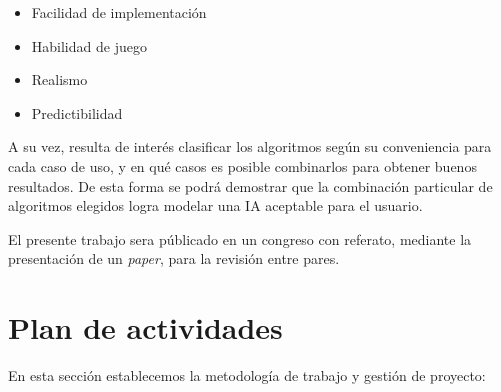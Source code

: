 \documentclass[a4paper]{article}
\begin{document}
\begin{itemize}
    \item Facilidad de implementación
    \item Habilidad de juego
    \item Realismo
    \item Predictibilidad
\end{itemize}

A su vez, resulta de interés clasificar los algoritmos según su conveniencia para cada caso de uso, y en qué casos es posible combinarlos para obtener buenos resultados. De esta forma se podrá demostrar que la combinación particular de algoritmos elegidos logra modelar una IA aceptable para el usuario.

El presente trabajo sera públicado en un congreso con referato, mediante la presentación de un \textit{paper}, para la revisión entre pares.

\section{Plan de actividades}

En esta sección establecemos la metodología de trabajo y gestión de proyecto:
\end{document}
